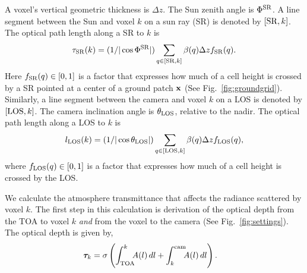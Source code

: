 \documentclass[10pt,twocolumn,letterpaper]{article}
\newcommand{\vect}[1]{\bm{#1}}
\newcommand{\derivsym}[1]{\,d{#1}}
\begin{document}
A voxel's vertical geometric thickness is $\Delta z$.  The Sun zenith
angle is $\Phi^{\rm SR}$. A line segment between the Sun and
voxel $k$ on a sun ray (SR) is denoted by $[{\rm SR},k]$. The optical path
length along a SR to $k$ is
\begin{equation}
  \tau_{\rm SR}(k)=(1/|\cos\Phi^{\rm SR}|)
     \sum_{q \in[{\rm SR},k]}
     \beta(q)
     \Delta z  f_{\rm SR}(q).
  \label{eq:lSRn}
\end{equation}
Here $f_{\rm SR}(q)\in [0,1]$ is a factor that expresses how much of
a cell height is crossed by a SR pointed at a center of a ground
patch ${\bf x}$ (See Fig.~\ref{fig:groundgrid}). Similarly, a line segment
between the camera and voxel $k$ on a LOS is denoted by $[{\rm
LOS},k]$. The camera inclination angle is $\theta_{\rm LOS}$, relative to the nadir.
The optical path length along a LOS to $k$ is
\begin{equation}
  l_{\rm LOS}(k)=(1/|\cos\theta_{\rm LOS}|)
     \sum_{q\in[{\rm LOS},k]}
     \beta(q)
     \Delta z
     f_{\rm LOS}(q),
  \label{eq:lLOSb}
\end{equation}
where $f_{\rm LOS}(q)\in [0,1]$ is a factor that expresses how much of a cell
height is crossed by the LOS.



We calculate the atmosphere transmittance that affects the radiance
scattered by voxel $k$.  The first step in this calculation is
derivation of the optical depth from the TOA to voxel $k$ \emph{and}
from the voxel to the camera (See Fig.~\ref{fig:settings}). The
optical depth is given by,
\begin{align}
  \vect{\tau}_{k} &= \sigma \left( \int_{\rm
      TOA}^{k}\!\!\!A(l)\derivsym{l} + \int_{k}^{\rm cam}\!\!\!A(l)
    \derivsym{l} \right).
  \label{eq:optical_depth}
\end{align}
\end{document}

